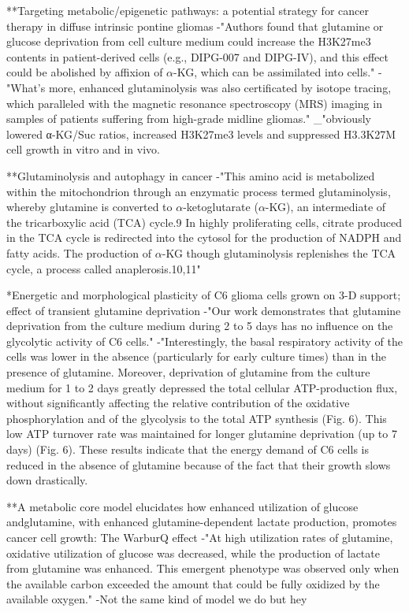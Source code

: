 \documentclass[11pt,a4paper]{article}
\begin{document}
**Targeting metabolic/epigenetic pathways: a potential strategy for cancer therapy in diffuse intrinsic pontine gliomas
-"Authors found that glutamine or glucose deprivation from cell culture medium could increase the H3K27me3 contents in patient-derived cells (e.g., DIPG-007 and DIPG-IV), and this effect could be abolished by affixion of $\alpha$-KG, which can be assimilated into cells."
-"What’s more, enhanced glutaminolysis was also certificated by isotope tracing, which paralleled with the magnetic resonance spectroscopy (MRS) imaging in samples of patients suffering from high-grade midline gliomas."
_"obviously lowered α-KG/Suc ratios, increased H3K27me3 levels and suppressed H3.3K27M cell growth in vitro and in vivo.

**Glutaminolysis and autophagy in cancer
-"This amino acid is metabolized within the mitochondrion through an enzymatic process termed glutaminolysis, whereby glutamine is converted to $\alpha$-ketoglutarate ($\alpha$-KG), an intermediate of the tricarboxylic acid (TCA) cycle.9 In highly proliferating cells, citrate produced in the TCA cycle is redirected into the cytosol for the production of NADPH and fatty acids. The production of $\alpha$-KG though glutaminolysis replenishes the TCA cycle, a process called anaplerosis.10,11"


*Energetic and morphological plasticity of C6 glioma cells grown on 3-D support; effect of transient glutamine deprivation 
-"Our work demonstrates that glutamine deprivation from the culture medium during 2 to 5 days has no influence on the glycolytic activity of C6 cells."
-"Interestingly, the basal respiratory activity of the cells was lower in the absence (particularly for early culture times) than in the presence of glutamine. Moreover, deprivation of glutamine from the culture medium for 1 to 2 days greatly depressed the total cellular ATP-production flux, without significantly affecting the relative contribution of the oxidative phosphorylation and of the glycolysis to the total ATP synthesis (Fig. 6). This low ATP turnover rate was maintained for longer glutamine deprivation (up to 7 days) (Fig. 6). These results indicate that the energy demand of C6 cells is reduced in the absence of glutamine because of the fact that their growth slows down drastically.

**A metabolic core model elucidates how enhanced utilization of glucose andglutamine, with enhanced glutamine-dependent lactate production, promotes cancer cell growth: The WarburQ effect
-"At high utilization rates of glutamine, oxidative utilization of glucose was decreased, while the production
of lactate from glutamine was enhanced. This emergent phenotype was observed only
when the available carbon exceeded the amount that could be fully oxidized by the available
oxygen."
-Not the same kind of model we do but hey
\end{document}
